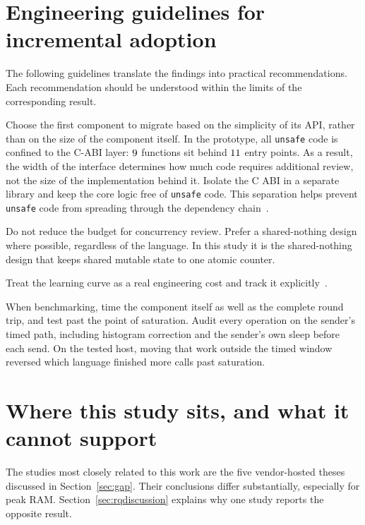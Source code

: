 \documentclass[english,oneside,a4paper,censored,csm,software-track-2020]{HYthesisML}
\begin{document}
\section{Engineering guidelines for incremental adoption}\label{sec:guidelines}
The following guidelines translate the findings into practical
recommendations. Each recommendation should be understood within the limits of
the corresponding result.

\begin{compactitem}
\item Choose the first component to migrate based on the simplicity of its API,
rather than on the size of the component itself. In the prototype, all
\texttt{unsafe} code is confined to the C-ABI layer: $9$ functions
sit behind $11$ entry points. As a result, the width of the
interface determines how much code requires additional review, not the size of
the implementation behind it. Isolate the C ABI in a separate library and keep the core logic free of
\texttt{unsafe} code. This separation helps prevent \texttt{unsafe} code from
spreading through the dependency chain~\cite{evans2020rust}.

\item Do not reduce the budget for concurrency review. Prefer a shared-nothing
design where possible, regardless of the language. In this study it is the
shared-nothing design that keeps shared mutable state to
one atomic counter.

\item Treat the learning curve as a real engineering cost and track it
explicitly~\cite{fulton2021adopting,crichton2024learning}.

\item When benchmarking, time the component itself as well as the complete
round trip, and test past the point of saturation. Audit every operation on the
sender's timed path, including histogram correction and the sender's own sleep before
each send. On the tested host, moving
that work outside the timed window reversed which language finished more calls
past saturation.
\end{compactitem}

\section[Where this study sits]{Where this study sits, and what it cannot support}\label{sec:standing}
The studies most closely related to this work are the five vendor-hosted theses
discussed in Section~\ref{sec:gap}. Their conclusions differ substantially, especially for peak RAM.
Section~\ref{sec:rqdiscussion} explains why one study reports the opposite
result.
\end{document}
